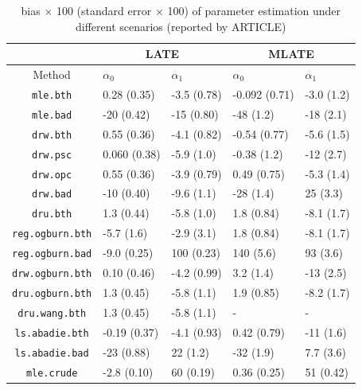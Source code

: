 \documentclass{article}
\begin{document}
\begin{table}
\footnotesize
\centering
\begin{tabular}[h]{c|p{2cm}<{\centering}p{2cm}<{\centering}|p{2cm}<{\centering}p{2cm}<{\centering}}
\toprule
    & \multicolumn{2}{c|}{LATE} &\multicolumn{2}{c}{MLATE}\\
\midrule
    Method & $\alpha_0$ & $\alpha_1$ & $\alpha_0$ & $\alpha_1$\\
\midrule
\texttt{mle.bth}&0.28 (0.35) & -3.5 (0.78)&-0.092 (0.71) &-3.0 (1.2)\\
\texttt{mle.bad}&-20 (0.42) & -15 (0.80)&-48 (1.2) & -18 (2.1)\\
\texttt{drw.bth}&0.55 (0.36) & -4.1 (0.82)&-0.54 (0.77) & -5.6 (1.5)\\
\texttt{drw.psc}&0.060 (0.38) & -5.9 (1.0)&-0.38 (1.2) & -12 (2.7)\\
\texttt{drw.opc}&0.55 (0.36) & -3.9 (0.79)&0.49 (0.75) & -5.3 (1.4)\\
\texttt{drw.bad}&-10 (0.40) & -9.6 (1.1)&-28 (1.4) & 25 (3.3)\\
\texttt{dru.bth}&1.3 (0.44) & -5.8 (1.0)&1.8 (0.84) & -8.1 (1.7)\\
\texttt{reg.ogburn.bth}&-5.7 (1.6) & -2.9 (3.1)&1.8 (0.84) & -8.1 (1.7)\\
\texttt{reg.ogburn.bad}&-9.0 (0.25) & 100 (0.23)&140 (5.6) & 93 (3.6)\\
\texttt{drw.ogburn.bth}&0.10 (0.46) & -4.2 (0.99)&3.2 (1.4) & -13 (2.5)\\
\texttt{dru.ogburn.bth}&1.3 (0.45) & -5.8 (1.1)&1.9 (0.85) & -8.2 (1.7)\\
\texttt{dru.wang.bth}&1.3 (0.45) & -5.8 (1.1)&- & -\\
\texttt{ls.abadie.bth}&-0.19 (0.37) & -4.1 (0.93)&0.42 (0.79) & -11 (1.6)\\
\texttt{ls.abadie.bad}&-23 (0.88) & 22 (1.2)&-32 (1.9) & 7.7 (3.6)\\
\texttt{mle.crude}&-2.8 (0.10) &60 (0.19)&0.36 (0.25) & 51 (0.42)\\
\bottomrule
\end{tabular}
\caption{bias $\times$ 100 (standard error $\times$ 100) of parameter estimation under different scenarios (reported by ARTICLE)}
\label{theirbias}
\end{table}
\end{document}
